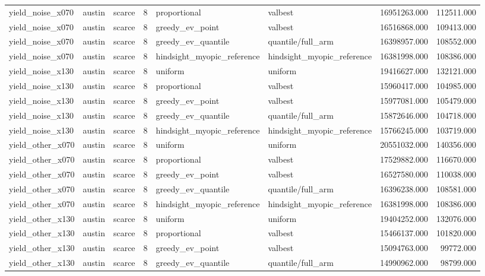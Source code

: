 \begin{tabular}{lllrllrr}
yield\_noise\_x070 & austin & scarce & 8 & proportional & valbest & 16951263.000 & 112511.000 \\
yield\_noise\_x070 & austin & scarce & 8 & greedy\_ev\_point & valbest & 16516868.000 & 109413.000 \\
yield\_noise\_x070 & austin & scarce & 8 & greedy\_ev\_quantile & quantile/full\_arm & 16398957.000 & 108552.000 \\
yield\_noise\_x070 & austin & scarce & 8 & hindsight\_myopic\_reference & hindsight\_myopic\_reference & 16381998.000 & 108386.000 \\
yield\_noise\_x130 & austin & scarce & 8 & uniform & uniform & 19416627.000 & 132121.000 \\
yield\_noise\_x130 & austin & scarce & 8 & proportional & valbest & 15960417.000 & 104985.000 \\
yield\_noise\_x130 & austin & scarce & 8 & greedy\_ev\_point & valbest & 15977081.000 & 105479.000 \\
yield\_noise\_x130 & austin & scarce & 8 & greedy\_ev\_quantile & quantile/full\_arm & 15872646.000 & 104718.000 \\
yield\_noise\_x130 & austin & scarce & 8 & hindsight\_myopic\_reference & hindsight\_myopic\_reference & 15766245.000 & 103719.000 \\
yield\_other\_x070 & austin & scarce & 8 & uniform & uniform & 20551032.000 & 140356.000 \\
yield\_other\_x070 & austin & scarce & 8 & proportional & valbest & 17529882.000 & 116670.000 \\
yield\_other\_x070 & austin & scarce & 8 & greedy\_ev\_point & valbest & 16527580.000 & 110038.000 \\
yield\_other\_x070 & austin & scarce & 8 & greedy\_ev\_quantile & quantile/full\_arm & 16396238.000 & 108581.000 \\
yield\_other\_x070 & austin & scarce & 8 & hindsight\_myopic\_reference & hindsight\_myopic\_reference & 16381998.000 & 108386.000 \\
yield\_other\_x130 & austin & scarce & 8 & uniform & uniform & 19404252.000 & 132076.000 \\
yield\_other\_x130 & austin & scarce & 8 & proportional & valbest & 15466137.000 & 101820.000 \\
yield\_other\_x130 & austin & scarce & 8 & greedy\_ev\_point & valbest & 15094763.000 & 99772.000 \\
yield\_other\_x130 & austin & scarce & 8 & greedy\_ev\_quantile & quantile/full\_arm & 14990962.000 & 98799.000 \\

\end{tabular}
